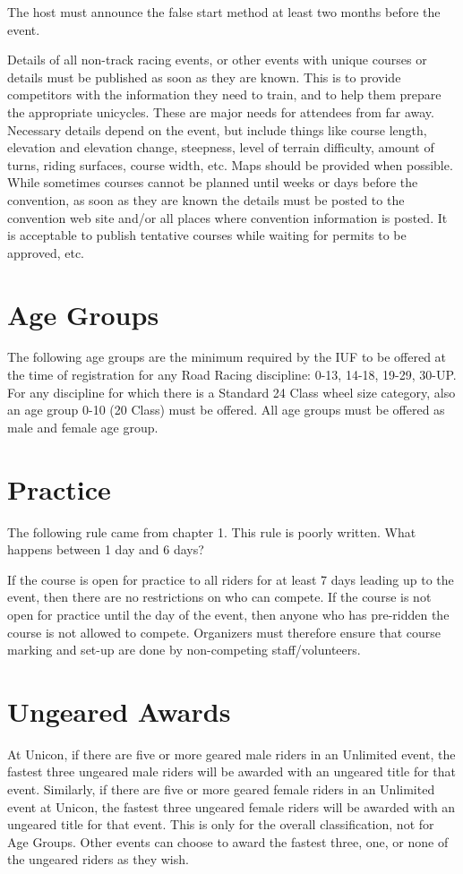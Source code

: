 The host must announce the false start method at least two months before the event.

Details of all non-track racing events, or other events with unique courses or details must be published as soon as they are known.
This is to provide competitors with the information they need to train, and to help them prepare the appropriate unicycles.
These are major needs for attendees from far away.
Necessary details depend on the event, but include things like course length, elevation and elevation change, steepness, level of terrain difficulty, amount of turns, riding surfaces, course width, etc.
Maps should be provided when possible.
While sometimes courses cannot be planned until weeks or days before the convention, as soon as they are known the details must be posted to the convention web site and/or all places where convention information is posted.
It is acceptable to publish tentative courses while waiting for permits to be approved, etc.

\section{Age Groups}

The following age groups are the minimum required by the IUF to be offered at the time of registration for any Road Racing discipline: 0-13, 14-18, 19-29, 30-UP.
For any discipline for which there is a Standard 24 Class wheel size category, also an age group 0-10 (20 Class) must be offered.
All age groups must be offered as male and female age group.

\section{Practice}

\begin{comment2016}
The following rule came from chapter 1.
This rule is poorly written.
What happens between 1 day and 6 days?
\end{comment2016}

If the course is open for practice to all riders for at least 7 days leading up to the event, then there are no restrictions on who can compete.
If the course is not open for practice until the day of the event, then anyone who has pre-ridden the course is not allowed to compete.
Organizers must therefore ensure that course marking and set-up are done by non-competing staff/volunteers.

\section{Ungeared Awards}
At Unicon, if there are five or more geared male riders in an Unlimited event, the fastest three ungeared male riders will be awarded with an ungeared title for that event.
Similarly, if there are five or more geared female riders in an Unlimited event at Unicon, the fastest three ungeared female riders will be awarded with an ungeared title for that event.
This is only for the overall classification, not for Age Groups.
Other events can choose to award the fastest three, one, or none of the ungeared riders as they wish.

